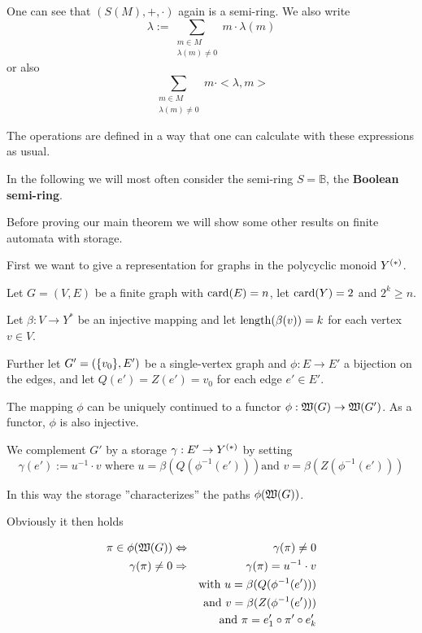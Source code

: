 One can see that $(S(M), +, \cdot)$ again is a semi-ring. We also write
\[ \lambda := \sum_{\substack{m \in M\\\lambda(m)\neq 0}} m \cdot \lambda(m) \]
or also
\[ \sum_{\substack{m \in M\\\lambda(m)\neq 0}} m \cdot {<}\lambda, m{>} \]

The operations are defined in a way that one can calculate with these
expressions as usual.

In the following we will most often consider the semi-ring $S = \mathbb{B}$, the
{\bf Boolean semi-ring}.

\bigskip
Before proving our main theorem we will show some other results on finite
automata with storage.

\bigskip
First we want to give a representation for graphs in the polycyclic monoid
$\mbox{${Y}^{(*)}$}$.

Let $G=(V, E)$ be a finite graph with $\mathrm{card}({E}) = n$, let $\mathrm{card}({Y}) = 2$ and
$2^k \geq n$.

Let $\beta: V \to Y^*$ be an injective mapping and let $\mathrm{length}({\beta(v)}) = k$
for each vertex $v \in V$.

Further let $G' = (\mbox{$\{v_0\}$}, E')$ be a single-vertex graph and $\phi: E \to
E'$ a bijection on the edges, and let $Q(e') = Z(e') = v_0$ for each edge $e'
\in E'$.

The mapping $\phi$ can be uniquely continued to a functor $\phi : \mbox{$\mathfrak{W}({G})$}
\to \mbox{$\mathfrak{W}({G'})$}$. As a functor, $\phi$ is also injective.

We complement $G'$ by a storage $\gamma: E' \to \mbox{${Y}^{(*)}$}$ by setting
\[ \gamma(e') := u^{-1} \cdot v\text{ where }u = \beta(Q(\phi^{-1}(e')))\text{
and }v = \beta(Z(\phi^{-1}(e'))) \]

In this way the storage ''characterizes'' the paths $\phi(\mbox{$\mathfrak{W}({G})$})$.

Obviously it then holds
\begin{lemma}
\begin{eqnarray*}
\pi \in \phi(\mbox{$\mathfrak{W}({G})$}) &\Leftrightarrow& \gamma(\pi) \neq 0 \\
\gamma(\pi) \neq 0 &\Rightarrow& \gamma(\pi) = u^{-1} \cdot v \\
&& \text{with }u = \beta(Q(\phi^{-1}(e'))) \\
&& \text{and }v = \beta(Z(\phi^{-1}(e'))) \\
&& \text{and }\pi = e'_1 \circ \pi' \circ e'_k
\end{eqnarray*}
\end{lemma}

